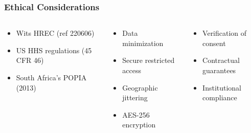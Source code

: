 \documentclass[aspectratio=169]{beamer}
\begin{document}
\begin{frame}
    \frametitle{Ethical Considerations}
    
    \begin{columns}[T]
        \begin{column}{0.32\textwidth}
            \begin{infobox}
                \begin{itemize}[leftmargin=*, itemsep=4pt]
                    \item Wits HREC (ref 220606)
                    \item US HHS regulations (45 CFR 46)
                    \item South Africa's POPIA (2013)
                \end{itemize}
            \end{infobox}
        \end{column}
        \begin{column}{0.32\textwidth}
            \begin{infobox}
                \begin{itemize}[leftmargin=*, itemsep=4pt]
                    \item Data minimization
                    \item Secure restricted access
                    \item Geographic jittering
                    \item AES-256 encryption
                \end{itemize}
            \end{infobox}
        \end{column}
        \begin{column}{0.32\textwidth}
            \begin{infobox}
                \begin{itemize}[leftmargin=*, itemsep=4pt]
                    \item Verification of consent
                    \item Contractual guarantees
                    \item Institutional compliance
                \end{itemize}
            \end{infobox}
        \end{column}
    \end{columns}
    
    \vspace{0.6cm}
    \begin{center}
    \end{center}
\end{frame}
\end{document}
